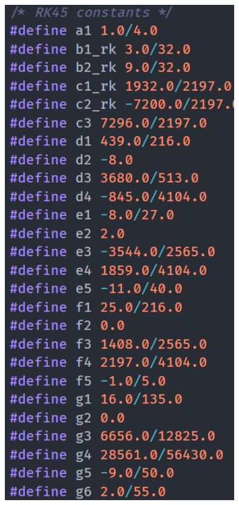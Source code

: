 \documentclass{beamer}
\begin{document}
\begin{frame}{}
    \centering

    \includegraphics[width=0.75\textwidth]{asset/rk45_constants.png}
\end{frame}
\end{document}
